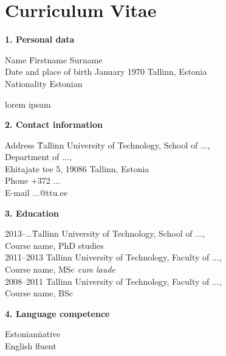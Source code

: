 \FloatBarrier
\section*{Curriculum Vitae}

\setlength{\parindent}{0cm} %

\textbf{1. Personal data}

\begin{tabbing}
Name 	\quad\quad\quad\quad\quad\quad\quad\quad\quad 	\=Firstname Surname \\
Date and place of birth  January 1970 Tallinn, Estonia\\
Nationality \> Estonian
\end{tabbing}
lorem ipsum

\textbf{2. Contact information}
\begin{tabbing}
Address	\quad\quad 	\= Tallinn University of Technology, School of ..., \\
                        \> Department of ..., \\
                        \> Ehitajate tee 5, 19086 Tallinn, Estonia \\
                        Phone \> +372 ...\\
                        E-mail\> ...@ttu.ee
\end{tabbing}

\textbf{3. Education}
\begin{tabbing}
2013--\ldots \quad\quad \=Tallinn University of Technology, School of ...,\\ 
             \>Course name, PhD studies \\
2011--2013	 	\>Tallinn University of Technology, Faculty of ...,\\ \>Course name, MSc \textit{cum laude}\\
2008--2011	 	\>Tallinn University of Technology, Faculty of ...,\\ \>Course name, BSc \\
\end{tabbing}


\textbf{4. Language competence}
\begin{tabbing}
Estonian\quad\quad \= native\\
English	 	\>fluent \\
\end{tabbing}

